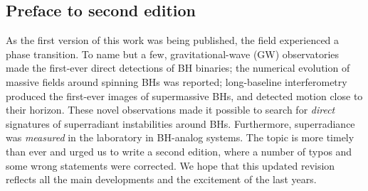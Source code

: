 \documentclass[11pt]{article}
\numberwithin{equation}{section} %
\begin{document}
\subsection*{Preface to second edition}

As the first version of this work was being published, the field experienced a phase transition.
To name but a few, gravitational-wave (GW) observatories made the first-ever direct detections of BH binaries; the 
numerical evolution of massive fields around spinning BHs was reported; long-baseline interferometry produced the 
first-ever images of supermassive BHs, and detected motion close to their horizon. These novel observations made it 
possible to search for \emph{direct} signatures of superradiant instabilities around BHs. Furthermore, superradiance 
was {\it measured} in the laboratory in BH-analog systems. 
%
The topic is more timely than ever and urged us to write a second edition, where a number of typos and some wrong statements were corrected. We hope that this updated 
revision reflects all the main developments and the excitement of the last years.



\clearpage
\newpage
\end{document}
